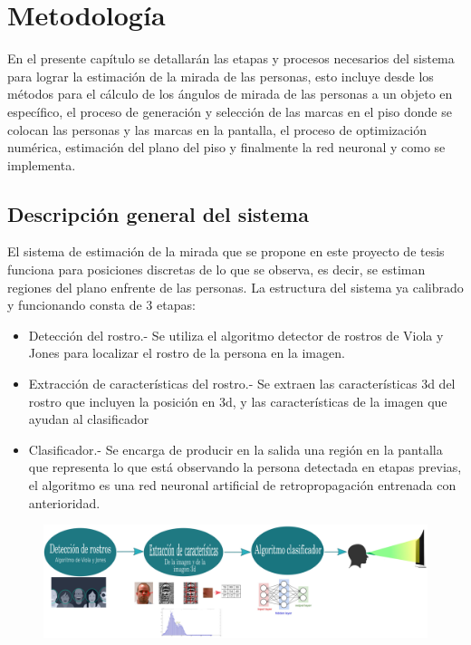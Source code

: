 \chapter{Metodología}

En el presente capítulo se detallarán las etapas y procesos necesarios del sistema para lograr la estimación de la mirada de las personas, esto incluye desde los métodos para el cálculo de los ángulos de mirada de las personas a un objeto en específico, el proceso de generación y selección de las marcas en el piso donde se colocan las personas y las marcas en la pantalla, el proceso de optimización numérica, estimación del plano del piso y finalmente la red neuronal y como se implementa.

 \section{Descripción general del sistema}
 El sistema de estimación de la mirada que se propone en este proyecto de tesis funciona para posiciones discretas de lo que se observa, es decir, se estiman regiones del plano enfrente de las personas. La estructura del sistema ya calibrado y funcionando consta de 3 etapas: 
 \begin{itemize}
 	\item Detección del rostro.- Se utiliza el algoritmo detector de rostros de Viola y Jones para localizar el rostro de la persona en la imagen.
 	\item Extracción de características del rostro.- Se extraen las características 3d del rostro que incluyen la posición en 3d, y las características de la imagen que ayudan al clasificador
 	\item Clasificador.- Se encarga de producir en la salida una región en la pantalla que representa lo que está observando la persona detectada en etapas previas, el algoritmo es una red neuronal artificial de retropropagación entrenada con anterioridad.
 \end{itemize}
\begin{figure}[htbp]
	\centering
	\includegraphics[width=1\textwidth]{./pictures/etapas}     	
\end{figure}
